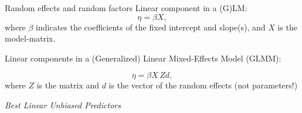 \documentclass[compress]{beamer}
\begin{document}
\begin{frame}{Random effects and random factors}
	Linear component in a (G)LM: 
	\begin{equation}
		\eta = \beta X,
	\end{equation}
	where $\beta$ indicates the coefficients of the fixed intercept and slope(s), and $X$ is the model-matrix.
	
	Linear components in a (Generalized) Linear Mixed-Effects Model (GLMM): 
	
	\begin{equation}
		\eta = \beta X \, Zd,
	\end{equation}
	where $Z$ is the matrix and $d$ is the vector of the random effects (not parameters!)
	
	
	\vspace{2.5mm}
	\begin{center}
		\emph{Best Linear Unbiased Predictors}
	\end{center}
\end{frame}
\end{document}
